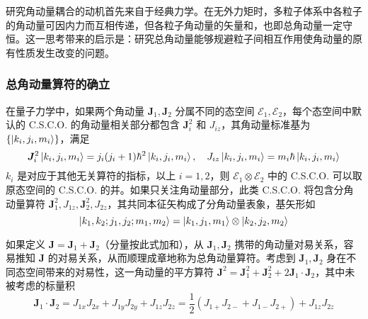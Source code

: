 \documentclass[cn,10pt,math=newtx,citestyle=gb7714-2015,bibstyle=gb7714-2015]{elegantbook}
\def\bm{\boldsymbol}
\def\ms{\mathscr}
\def\ox{\otimes}
\begin{document}
研究角动量耦合的动机首先来自于经典力学。在无外力矩时，多粒子体系中各粒子的角动量可因内力而互相传递，但各粒子角动量的矢量和，也即总角动量一定守恒。这一思考带来的启示是：研究总角动量能够规避粒子间相互作用使角动量的原有性质发生改变的问题。

\subsubsection{总角动量算符的确立}

在量子力学中，如果两个角动量 $\bm J_1,\bm J_2$ 分属不同的态空间 $\ms E_1,\ms E_2$，每个态空间中默认的 C.S.C.O. 的角动量相关部分都包含 $\bm J_i^2$ 和 $J_{iz}$，其角动量标准基为 $\{\ket{k_i,j_i,m_i}\}$，满足
\begin{equation}
    \bm J_i^2\ket{k_i,j_i,m_i} = j_i(j_i+1)\hbar^2\ket{k_i,j_i,m_i},\quad J_{iz}\ket{k_i,j_i,m_i} = m_i\hbar\ket{k_i,j_i,m_i}
\end{equation}
$k_i$ 是对应于其他无关算符的指标，以上 $i=1,2$，则 $\ms E_1\ox\ms E_2$ 中的 C.S.C.O. 可以取原态空间的 C.S.C.O. 的并。如果只关注角动量部分，此类 C.S.C.O. 将包含分角动量算符 $\bm J_1^2,J_{1z},\bm J_2^2,J_{2z}$，其共同本征矢构成了分角动量表象，基矢形如
\begin{equation}
    \ket{k_1,k_2;j_1,j_2;m_1,m_2} = \ket{k_1,j_1,m_1}\ox\ket{k_2,j_2,m_2}
\end{equation}

如果定义 $\bm J = \bm J_1+\bm J_2$（分量按此式加和），从 $\bm J_1,\bm J_2$ 携带的角动量对易关系，容易推知 $\bm J$ 的对易关系，从而顺理成章地称为总角动量算符。考虑到 $\bm J_1,\bm J_2$ 身在不同态空间带来的对易性，这一角动量的平方算符 $\bm J^2 = \bm J_1^2+\bm J_2^2+2\bm J_1\cdot\bm J_2$，其中未被考虑的标量积
\begin{equation}
    \bm J_1\cdot\bm J_2=J_{1x}J_{2x}+J_{1y}J_{2y}+J_{1z}J_{2z} = \frac 1 2(J_{1+}J_{2-}+J_{1-}J_{2+})+J_{1z}J_{2z}
\end{equation}
\end{document}
